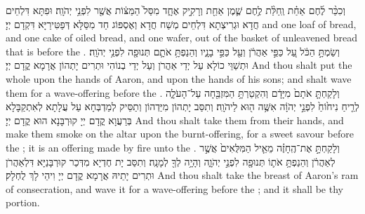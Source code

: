 {וְכִכַּ֨ר לֶ֜חֶם אַחַ֗ת וְֽחַלַּ֨ת לֶ֥חֶם שֶׁ֛מֶן אַחַ֖ת וְרָקִ֣יק אֶחָ֑ד מִסַּל֙ הַמַּצּ֔וֹת אֲשֶׁ֖ר לִפְנֵ֥י יְהֹוָֽה׃
}
{וּפִתָּא דִּלְחֵים חֲדָא וּגְרִיצְתָא דִּלְחֵים מְשַׁח חֲדָא וְאֶסְפּוֹג חַד מִסַּלָּא דְּפַטִּירַיָּא דִּקְדָם יְיָ׃}
{and one loaf of bread, and one cake of oiled bread, and one wafer, out of the basket of unleavened bread that is before the \lord.}{}
{וְשַׂמְתָּ֣ הַכֹּ֔ל עַ֚ל כַּפֵּ֣י אַהֲרֹ֔ן וְעַ֖ל כַּפֵּ֣י בָנָ֑יו וְהֵנַפְתָּ֥ אֹתָ֛ם תְּנוּפָ֖ה לִפְנֵ֥י יְהֹוָֽה׃
}
{וּתְשַׁוֵּי כוֹלָא עַל יְדֵי אַהֲרֹן וְעַל יְדֵי בְנוֹהִי וּתְרִים יָתְהוֹן אֲרָמָא קֳדָם יְיָ׃}
{And thou shalt put the whole upon the hands of Aaron, and upon the hands of his sons; and shalt wave them for a wave-offering before the \lord.}{}
{וְלָקַחְתָּ֤ אֹתָם֙ מִיָּדָ֔ם וְהִקְטַרְתָּ֥ הַמִּזְבֵּ֖חָה עַל־הָעֹלָ֑ה לְרֵ֤יחַ נִיח֙וֹחַ֙ לִפְנֵ֣י יְהֹוָ֔ה אִשֶּׁ֥ה ה֖וּא לַיהֹוָֽה׃
}
{וְתִסַּב יָתְהוֹן מִיַּדְהוֹן וְתַסֵּיק לְמַדְבְּחָא עַל עֲלָתָא לְאִתְקַבָּלָא בְּרַעֲוָא קֳדָם יְיָ קוּרְבָּנָא הוּא קֳדָם יְיָ׃}
{And thou shalt take them from their hands, and make them smoke on the altar upon the burnt-offering, for a sweet savour before the \lord; it is an offering made by fire unto the \lord.}{}
{וְלָקַחְתָּ֣ אֶת־הֶֽחָזֶ֗ה מֵאֵ֤יל הַמִּלֻּאִים֙ אֲשֶׁ֣ר לְאַהֲרֹ֔ן וְהֵנַפְתָּ֥ אֹת֛וֹ תְּנוּפָ֖ה לִפְנֵ֣י יְהֹוָ֑ה וְהָיָ֥ה לְךָ֖ לְמָנָֽה׃}
{וְתִסַּב יָת חֶדְיָא מִדְּכַר קוּרְבָּנַיָּא דִּלְאַהֲרֹן וּתְרִים יָתֵיהּ אֲרָמָא קֳדָם יְיָ וִיהֵי לָךְ לֻחְלָק׃}
{And thou shalt take the breast of Aaron’s ram of consecration, and wave it for a wave-offering before the \lord; and it shall be thy portion.}{}
